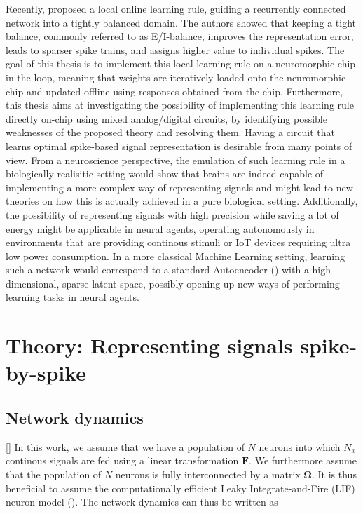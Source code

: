 \documentclass[twoside,11pt]{article}
\begin{document}
Recently, \cite{wiel2017learning} proposed a local online learning rule, guiding a recurrently connected
network into a tightly balanced domain. The authors showed that keeping a tight balance,
commonly referred to as E/I-balance, improves the representation error, leads to sparser spike
trains, and assigns higher value to individual spikes.
The goal of this thesis is to implement this local learning rule on a neuromorphic chip in-the-loop,
meaning that weights are iteratively loaded onto the neuromorphic chip and updated offline using
responses obtained from the chip. Furthermore, this thesis aims at investigating the
possibility of implementing this learning rule directly on-chip using mixed analog/digital
circuits, by identifying possible weaknesses of the proposed theory and resolving them.
Having a circuit that learns optimal spike-based signal representation is desirable from many points of view.
From a neuroscience perspective, the emulation of such learning rule in a biologically realisitic setting
would show that brains are indeed capable of implementing a more complex way of representing signals
and might lead to new theories on how this is actually achieved in a pure biological setting.
Additionally, the possibility of representing signals with high precision while saving a lot of
energy might be applicable in neural agents, operating autonomously in environments that are providing
continous stimuli or IoT devices requiring ultra low power consumption.
In a more classical Machine Learning setting, learning such a network would
correspond to a standard Autoencoder (\cite{Vincent:2008:ECR:1390156.1390294}) with a high dimensional, sparse latent space, possibly
opening up new ways of performing learning tasks in neural agents.


\section{Theory: Representing signals spike-by-spike}

\subsection{Network dynamics}

[\cite{wiel2017learning}] In this work, we assume that we have a population of $N$ neurons into which $N_x$ continous
signals are fed using a linear transformation $\mathbf{F}$. We furthermore assume that the population
of $N$ neurons is fully interconnected by a matrix $\mathbf{\Omega}$. It is thus beneficial to assume 
the computationally efficient Leaky Integrate-and-Fire (LIF) neuron model (\cite{Lapicque}). 
The network dynamics can thus be written as
\end{document}

